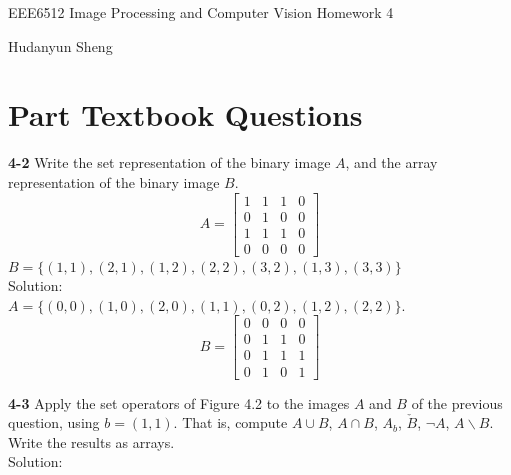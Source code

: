 \documentclass[a4paper]{article}
\begin{document}
\begin{spacing}{2.0}
\begin{flushleft}\begin{huge}EEE6512 Image Processing and Computer Vision   Homework 4\end{huge}\end{flushleft}
\begin{flushright}\begin{Large} Hudanyun Sheng \end{Large}\end{flushright}

\section*{\huge\textbf{ Part \uppercase\expandafter{} Textbook Questions}  }
	\normalsize

	\textbf{4-2} Write the set representation of the binary image $A$, and the array representation of the binary image $B$. 
	$$A = \begin{bmatrix} 1 & 1 & 1 & 0 \\ 0 & 1 & 0 & 0 \\  1 & 1 & 1 & 0 \\ 0 & 0 & 0 & 0 \end{bmatrix}$$
$B = \{(1,1), (2,1), (1,2), (2,2), (3,2), (1,3), (3,3)\}$\\
	Solution:\\ $A = \{(0,0), (1,0), (2,0), (1,1), (0,2), (1,2), (2,2)\}$.\\
	$$B = \begin{bmatrix} 0 & 0 & 0 & 0 \\ 0 & 1 & 1 & 0 \\ 0 & 1 & 1 & 1\\ 0 & 1 & 0 & 1\end{bmatrix}$$
	
	\noindent
	\textbf{4-3} Apply the set operators of Figure 4.2 to the images $A$ and $B$ of the previous question, using $b = (1,1)$. That is, compute $A \cup B$, $A \cap B$, $A_b$, $\check{B}$, $\neg A$, $A\backslash B$. Write the results as arrays. \\
	Solution: \\
	

\end{spacing}
\end{document}
